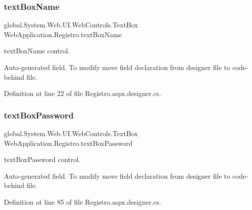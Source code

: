 \mbox{\label{classWebApplication_1_1Registro_a3b46f9fd6df72ec564e46e3b924ab40b}} 
\subsubsection{\texorpdfstring{textBoxName}{textBoxName}}
{\footnotesize\ttfamily global.\+System.\+Web.\+U\+I.\+Web\+Controls.\+Text\+Box Web\+Application.\+Registro.\+text\+Box\+Name\hspace{0.3cm}{\ttfamily [protected]}}



text\+Box\+Name control. 

Auto-\/generated field. To modify move field declaration from designer file to code-\/behind file. 

Definition at line 22 of file Registro.\+aspx.\+designer.\+cs.

\mbox{\label{classWebApplication_1_1Registro_a7ec9a6762b64871aac1ce8518bd33f29}} 
\subsubsection{\texorpdfstring{textBoxPassword}{textBoxPassword}}
{\footnotesize\ttfamily global.\+System.\+Web.\+U\+I.\+Web\+Controls.\+Text\+Box Web\+Application.\+Registro.\+text\+Box\+Password\hspace{0.3cm}{\ttfamily [protected]}}



text\+Box\+Password control. 

Auto-\/generated field. To modify move field declaration from designer file to code-\/behind file. 

Definition at line 85 of file Registro.\+aspx.\+designer.\+cs.

\mbox{\label{classWebApplication_1_1Registro_abdcdc987a1957369c80898f5a3b1711a}} 
